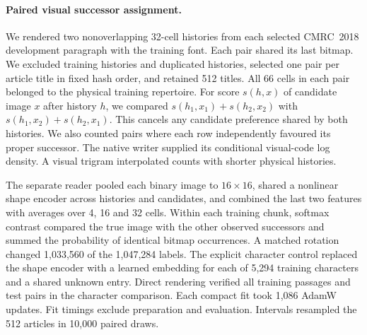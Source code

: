 \paragraph{Paired visual successor assignment.}
We rendered two nonoverlapping 32-cell histories from each selected
CMRC~2018 development paragraph with the training font. Each pair shared
its last bitmap. We excluded training histories and duplicated histories,
selected one pair per article title in fixed hash order, and retained 512
titles. All 66 cells in each pair belonged to the physical training repertoire.
For score $s(h,x)$ of candidate image $x$ after history $h$, we compared
$s(h_1,x_1)+s(h_2,x_2)$ with $s(h_1,x_2)+s(h_2,x_1)$. This cancels
any candidate preference shared by both histories. We also counted pairs
where each row independently favoured its proper successor. The native
writer supplied its conditional visual-code log density. A visual trigram
interpolated counts with shorter physical histories.

The separate reader pooled each binary image to $16\times16$, shared a
nonlinear shape encoder across histories and candidates, and combined the
last two features with averages over 4, 16 and 32 cells. Within each training
chunk, softmax contrast compared the true image with the other observed
successors and summed the probability of identical bitmap occurrences. A
matched rotation changed 1,033,560 of the 1,047,284 labels. The explicit
character control replaced the shape encoder with a learned embedding for
each of 5,294 training characters and a shared unknown entry. Direct
rendering verified all training passages and test pairs in the character
comparison. Each compact fit took 1,086 AdamW updates. Fit timings exclude
preparation and evaluation. Intervals resampled the 512 articles in 10,000
paired draws.
